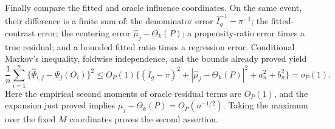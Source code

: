 Finally compare the fitted and oracle influence coordinates. On the same event, their difference is a finite sum of: the denominator error \(\bar I_g^{-1}-\pi^{-1}\); the fitted-contrast error; the centering error \(\widehat\mu_j-\Theta_k(P)\); a propensity-ratio error times a true residual; and a bounded fitted ratio times a regression error. Conditional Markov's inequality, foldwise independence, and the bounds already proved yield
\[
 \frac1n\sum_{i=1}^n\{\widehat\Psi_{i,j}-\Psi_j(O_i)\}^2
 \le O_P(1)\{(\bar I_g-\pi)^2
 +|\widehat\mu_j-\Theta_k(P)|^2+a_n^2+b_n^2\}=o_P(1).
\]
Here the empirical second moments of oracle residual terms are \(O_P(1)\), and the expansion just proved implies \(\widehat\mu_j-\Theta_k(P)=O_P(n^{-1/2})\). Taking the maximum over the fixed \(M\) coordinates proves the second assertion.